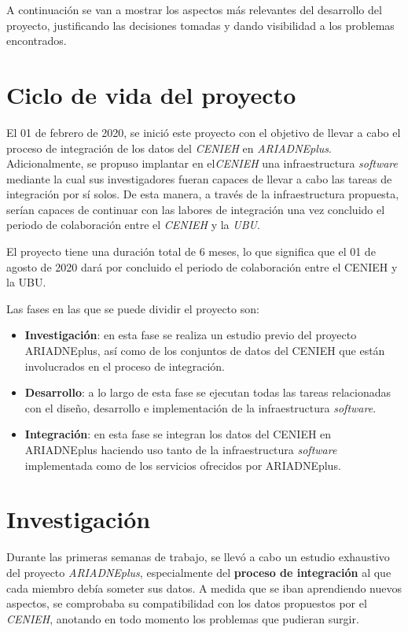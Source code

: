 
A continuación se van a mostrar los aspectos más relevantes del
desarrollo del proyecto, justificando las decisiones tomadas y dando
visibilidad a los problemas encontrados.

\section{Ciclo de vida del proyecto}

El 01 de febrero de 2020, se inició este proyecto con el objetivo de
llevar a cabo el proceso de integración de los datos del \emph{CENIEH} en
\emph{ARIADNEplus}. Adicionalmente, se propuso implantar en el\emph{CENIEH} una
infraestructura \emph{software} mediante la cual sus investigadores
fueran capaces de llevar a cabo las tareas de integración por sí
solos. De esta manera, a través de la infraestructura propuesta, serían
capaces de continuar con las labores de integración una vez concluido el
periodo de colaboración entre el \emph{CENIEH} y la \emph{UBU}.

El proyecto tiene una duración total de 6 meses, lo que significa
que el 01 de agosto de 2020 dará por concluido el periodo de colaboración entre
el CENIEH y la UBU. 

Las fases en las que se puede dividir el proyecto son:

\begin{itemize}
\tightlist
\item
  \textbf{Investigación}: en esta fase se realiza un estudio previo del
  proyecto ARIADNEplus, así como de los conjuntos de datos del CENIEH
  que están involucrados en el proceso de integración.
\item
  \textbf{Desarrollo}: a lo largo de esta fase se ejecutan todas las
  tareas relacionadas con el diseño, desarrollo e implementación de la
  infraestructura \emph{software}.
\item
  \textbf{Integración}: en esta fase se integran los datos del CENIEH en
  ARIADNEplus haciendo uso tanto de la infraestructura \emph{software}
  implementada como de los servicios ofrecidos por ARIADNEplus.
\end{itemize}


\section{Investigación}

Durante las primeras semanas de trabajo, se llevó a cabo un estudio
exhaustivo del proyecto \emph{ARIADNEplus}, especialmente del \textbf{proceso
de integración} al que cada miembro debía someter sus datos. A medida
que se iban aprendiendo nuevos aspectos, se comprobaba su compatibilidad
con los datos propuestos por el \emph{CENIEH}, anotando en todo momento los
problemas que pudieran surgir.


